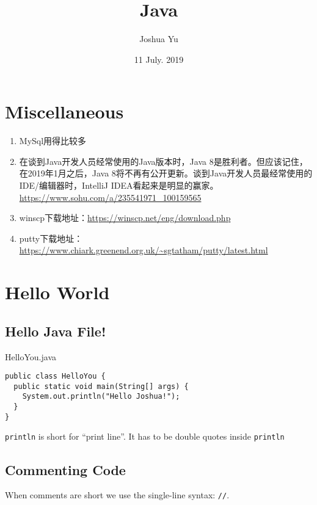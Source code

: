 \documentclass[a4paper, 12pt]{article}
\begin{document}

\large
\title{Java}
\author{Joshua Yu}
\date{11 July. 2019}
\maketitle
\tableofcontents


\section{Miscellaneous}

\begin{enumerate}
\item MySql用得比较多

\item 在谈到Java开发人员经常使用的Java版本时，Java 8是胜利者。但应该记住，在2019年1月之后，Java 8将不再有公开更新。谈到Java开发人员最经常使用的IDE/编辑器时，IntelliJ IDEA看起来是明显的赢家。 \url{https://www.sohu.com/a/235541971_100159565}

\item winscp下载地址：\url{https://winscp.net/eng/download.php}

\item putty下载地址：\url{https://www.chiark.greenend.org.uk/~sgtatham/putty/latest.html}

\end{enumerate}

\section{Hello World}
\subsection{Hello Java File!}
HelloYou.java

\begin{verbatim}
public class HelloYou {
  public static void main(String[] args) {
    System.out.println("Hello Joshua!");
  }
}
\end{verbatim}
\verb|println| is short for ``print line''. It has to be double quotes inside \verb|println|

\subsection{Commenting Code}
When comments are short we use the single-line syntax: \verb|//|.
\end{document}
